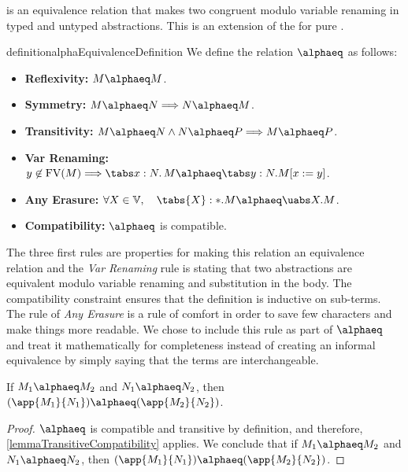 \alphaequivalence is an equivalence relation that makes two \lambdatauterms congruent modulo variable renaming in typed and untyped abstractions. This is an extension of the \alphaequivalence for pure \lambdacalc.

\begin{reusable}{definition}{alphaEquivalenceDefinition}
We define the \alphaequivalence relation $\alphaeq$ as follows:

\begin{itemize}
    \item \textbf{Reflexivity:} \( M \alphaeq M \).
    \item \textbf{Symmetry:} \( M \alphaeq N \Longrightarrow N \alphaeq M \).
    \item \textbf{Transitivity:} \( M \alphaeq N \land N \alphaeq P \Longrightarrow M \alphaeq P \).
    \item \textbf{Var Renaming:} $y \not\in\text{FV}(M) \Longrightarrow \tabs x:N.\,M \alphaeq \tabs y:N.M[x:=y]$.
    \item \textbf{Any Erasure:} $\forall X \in \mathbb{V},\quad \tabs {X}:{*}.M \alphaeq \uabs X.M$.
    \item \textbf{Compatibility:} $\alphaeq$ is compatible.
\end{itemize}
\end{reusable}

The three first rules are properties for making this relation an equivalence relation and the \textit{Var Renaming} rule is stating that two abstractions are equivalent modulo variable renaming and substitution in the body. The compatibility constraint ensures that the definition is inductive on sub-terms. The rule of \textit{Any Erasure} is a rule of comfort in order to save few characters and make things more readable. We chose to include this rule as part of $\alphaeq$ and treat it mathematically for completeness instead of creating an informal equivalence by simply saying that the terms are interchangeable.

\begin{lemma}
    If $M_1 \alphaeq M_2$ and $N_1 \alphaeq N_2$, then $(\app {M_1} {N_1}) \alphaeq (\app {M_2} {N_2})$.
\end{lemma}

\begin{proof}
    $\alphaeq$ is compatible and transitive by definition, and therefore, \cref{lemmaTransitiveCompatibility} applies. We conclude that if $M_1 \alphaeq M_2$ and $N_1 \alphaeq N_2$, then $(\app {M_1} {N_1}) \alphaeq (\app {M_2} {N_2})$.
\end{proof}


